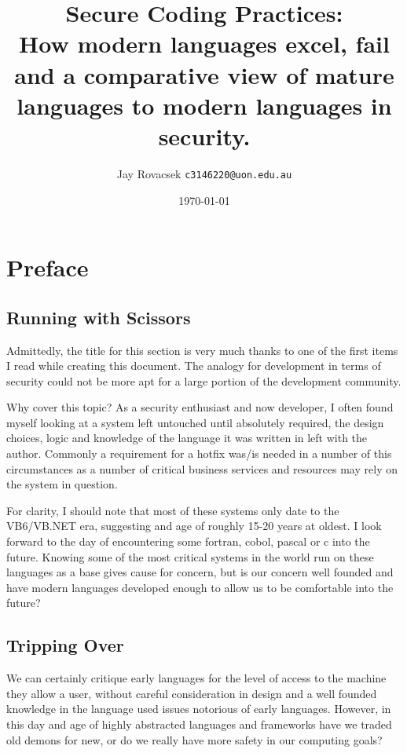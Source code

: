 \documentclass[
    a4paper,
    12pt,
    headings=normal
]{scrreprt}
\title{Secure Coding Practices:
    \protect\\How modern languages excel, fail and a 
    comparative view of mature languages to modern languages in security.}
\author{
        Jay Rovacsek
        \texttt{c3146220@uon.edu.au}\\
    }
\date{\today}
\begin{document}
    \begin{titlingpage}
        \maketitle
    \end{titlingpage}
    \newpage

    \tableofcontents

    \newpage

    \section{Preface}
    \subsection{Running with Scissors}
        Admittedly, the title\cite{Seacord} for this section is very much thanks to one of the first
        items I read while creating this document. The analogy for development in terms of security 
        could not be more apt for a large portion of the development community.

        Why cover this topic? As a security enthusiast and now developer, I often found myself 
        looking at a system left untouched until absolutely required, the design choices, logic and
        knowledge of the language it was written in left with the author. Commonly a requirement 
        for a hotfix was/is needed in a number of this circumstances as a number of critical 
        business services and resources may rely on the system in question.

        For clarity, I should note that most of these systems only date to the VB6/VB.NET era, suggesting
        and age of roughly 15-20 years at oldest. I look forward to the day of encountering some
        fortran, cobol, pascal or c into the future.
        Knowing some of the most critical systems in the world run on these languages as a base
        gives cause for concern, but is our concern well founded and have modern languages 
        developed enough to allow us to be comfortable into the future?

    \subsection{Tripping Over}
        We can certainly critique early languages for the level of access to the machine they allow 
        a user, without careful consideration in design and a well founded knowledge in the language 
        used issues notorious of early languages. However, in this day and age of highly abstracted 
        languages and frameworks have we traded old demons for new, or do we really have more safety
        in our computing goals?
\end{document}
